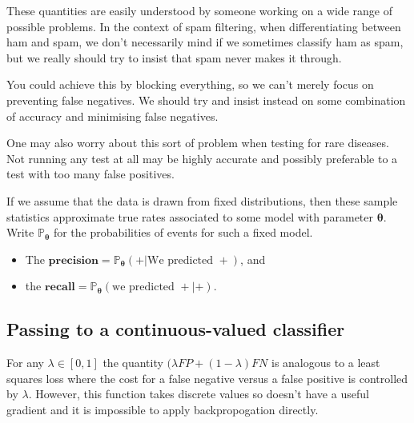 \documentclass[10pt,a4paper]{article}
\begin{document}
These quantities are easily understood by someone working on a wide range of possible problems.
In the context of spam filtering, when differentiating between ham and spam, we don't necessarily mind if we sometimes classify ham as spam, but we really should try to insist that spam never makes it through.

You could achieve this by blocking everything, so we can't merely focus on preventing false negatives.
We should try and insist instead on some combination of accuracy and minimising false negatives.

One may also worry about this sort of problem when testing for rare diseases.
Not running any test at all may be highly accurate and possibly preferable to a test with too many false positives.

If we assume that the data is drawn from fixed distributions, then these sample statistics approximate true rates associated to some model with parameter $\boldsymbol\theta$.
Write $\mathbb P_{\boldsymbol\theta}$ for the probabilities of events for such a fixed model.
\begin{itemize}
\item The $\textbf{precision}=\mathbb P_{\boldsymbol\theta}(+|\text{We predicted }+)$, and
\item the $\textbf{recall}=\mathbb P_{\boldsymbol\theta}(\text{we predicted }+|+)$.
\end{itemize}

\subsection{Passing to a continuous-valued classifier}
For any $\lambda\in[0,1]$ the quantity $(\lambda FP+(1-\lambda)FN$ is analogous to a least squares loss where the cost for a false negative versus a false positive is controlled by $\lambda$.
However, this function takes discrete values so doesn't have a useful gradient and it is impossible to apply backpropogation directly.
\end{document}
